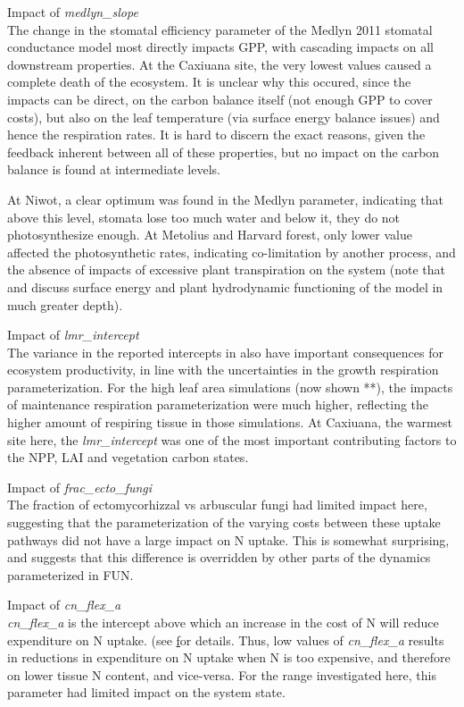 \documentclass[draft,linenumbers]{agujournal}
\begin{document}
Impact of \emph{medlyn\_slope}\\
The change in the stomatal efficiency parameter of the Medlyn 2011 stomatal conductance model most directly impacts GPP, with cascading impacts on all downstream properties. At the Caxiuana site, the very lowest values caused a complete death of the ecosystem. It is unclear why this occured, since the impacts can be direct, on the carbon balance itself (not enough GPP to cover costs), but also on the leaf temperature (via surface energy balance issues) and hence the respiration rates. It is hard to discern the exact reasons, given the feedback inherent between all of these properties, but no impact on the carbon balance is found at intermediate levels.

At Niwot, a clear optimum was found in the Medlyn parameter, indicating that above this level, stomata lose too much water and below it, they do not photosynthesize enough. At Metolius and Harvard forest, only lower value affected the photosynthetic rates, indicating co-limitation by another process, and the absence of impacts of excessive plant transpiration on the system (note that \cite{kennedy} and \cite{dagon} discuss surface energy and plant hydrodynamic functioning of the model in much greater depth). 

Impact of \emph{lmr\_intercept}\\
The variance in the reported intercepts in \cite{atkin2016} also have important consequences for ecosystem productivity, in line with the uncertainties in the growth respiration parameterization. For the high leaf area simulations (now shown **), the impacts of maintenance respiration parameterization were much higher, reflecting the higher amount of respiring tissue in those simulations. At Caxiuana, the warmest site here, the \emph{lmr\_intercept} was one of the most important contributing factors to the NPP, LAI and vegetation carbon states.  

Impact of \emph{frac\_ecto\_fungi}\\
The fraction of ectomycorhizzal vs arbuscular fungi had limited impact here, suggesting that the parameterization of the varying costs between these uptake pathways did not have a large impact on N uptake. This is somewhat surprising, and suggests that this difference is overridden by other parts of the dynamics parameterized in FUN.

Impact of \emph{cn\_flex\_a}\\
\emph{cn\_flex\_a}  is the intercept above which an increase in the cost of N will reduce expenditure on N uptake.  (see \href{https://escomp.github.io/ctsm-docs/doc/build/html/tech_note/FUN/CLM50_Tech_Note_FUN.html#modifications-to-allow-variation-in-c-n-ratios} for details. Thus, low values of \emph{cn\_flex\_a}  results in reductions in expenditure on N uptake when N is too expensive, and therefore on lower tissue N content, and vice-versa.   For the range investigated here, this parameter had limited impact on the system state. 
\end{document}
